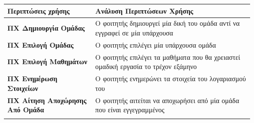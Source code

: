 \documentclass[
]{article}
\begin{document}
\begin{longtable}[]{@{}ll@{}}
\toprule
\begin{minipage}[b]{0.35\columnwidth}\raggedright
Περιπτώσεις χρήσης\strut
\end{minipage} & \begin{minipage}[b]{0.59\columnwidth}\raggedright
Ανάλυση Περιπτώσεων Χρήσης\strut
\end{minipage}\tabularnewline
\midrule
\endhead
\begin{minipage}[t]{0.35\columnwidth}\raggedright
\textbf{ΠΧ Δημιουργία Ομάδας}\strut
\end{minipage} & \begin{minipage}[t]{0.59\columnwidth}\raggedright
Ο φοιτητής δημιουργεί μία δική του ομάδα αντί να εγγραφεί σε μία
υπάρχουσα\strut
\end{minipage}\tabularnewline
\begin{minipage}[t]{0.35\columnwidth}\raggedright
\textbf{ΠΧ Επιλογή Ομάδας}\strut
\end{minipage} & \begin{minipage}[t]{0.59\columnwidth}\raggedright
Ο φοιτητής επιλέγει μία υπάρχουσα ομάδα\strut
\end{minipage}\tabularnewline
\begin{minipage}[t]{0.35\columnwidth}\raggedright
\textbf{ΠΧ Επιλογή Μαθημάτων}\strut
\end{minipage} & \begin{minipage}[t]{0.59\columnwidth}\raggedright
Ο φοιτητής επιλέγει τα μαθήματα που θα χρειαστεί ομαδική εργασία το
τρέχον εξάμηνο\strut
\end{minipage}\tabularnewline
\begin{minipage}[t]{0.35\columnwidth}\raggedright
\textbf{ΠΧ Ενημέρωση Στοιχείων}\strut
\end{minipage} & \begin{minipage}[t]{0.59\columnwidth}\raggedright
Ο φοιτητής ενημερώνει τα στοιχεία του λογαριασμού του\strut
\end{minipage}\tabularnewline
\begin{minipage}[t]{0.35\columnwidth}\raggedright
\textbf{ΠΧ Αίτηση Αποχώρησης Από Ομάδα}\strut
\end{minipage} & \begin{minipage}[t]{0.59\columnwidth}\raggedright
Ο φοιτητής αιτείται να αποχωρήσει από μία ομάδα που είναι
εγγεγραμμένος\strut
\end{minipage}\tabularnewline
\begin{minipage}[t]{0.35\columnwidth}\raggedright

\end{minipage}
\end{longtable}
\end{document}
